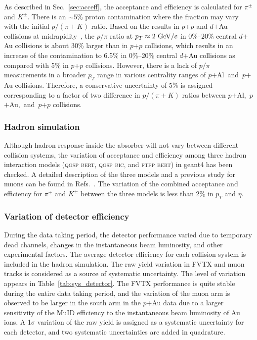 \documentclass[twocolumn,letterpaper,aps,prc,longbibliography,superscriptaddress,nofootinbib,floatfix]{revtex4-2}
\newcommand{\pt}{\mbox{$p_T$}\xspace}
\newcommand{\pp}{\mbox{$p$+$p$}\xspace}
\newcommand{\dau}{\mbox{$d$$+$Au}\xspace}
\newcommand{\pau}{\mbox{$p$$+$Au}\xspace}
\newcommand{\palau}{\mbox{$p$$+$Al and $p$$+$Au}\xspace}
\newcommand{\palaup}{\mbox{$p$$+$Al, $p$$+$Au, and $p$+$p$}\xspace}
\newcommand{\geant}{\mbox{{\sc geant4}}\xspace}
\begin{document}
As described in Sec.~\ref{sec:acceff}, the acceptance and efficiency is 
calculated for $\pi^{\pm}$ and $K^{\pm}$. There is an $\sim5\%$ proton 
contamination where the fraction may vary with the initial $p/(\pi+K)$ 
ratio. Based on the results in \pp and \dau collisions at 
midrapidity~\cite{Adare:2011vy,Agakishiev:2011dc,Adare:2013esx}, the 
$p/\pi$ ratio at $\pt\approx2~{\rm GeV}/c$ in 0\%--20\% central \dau 
collisions is about 30\% larger than in \pp collisions, which results in 
an increase of the contamination to 6.5\% in 0\%--20\% central \dau 
collisions as compared with 5\% in \pp collisions. However, there is a 
lack of $p/\pi$ measurements in a broader \pt range in various 
centrality ranges of \palau collisions. Therefore, a conservative 
uncertainty of 5\% is assigned corresponding to a factor of two 
difference in $p/(\pi+K)$ ratios between \palaup collisions.

\subsubsection{Hadron simulation}

Although hadron response inside the absorber will not vary between 
different collision systems, the variation of acceptance and efficiency 
among three hadron interaction models (\textsc{qgsp bert}, \textsc{qgsp 
bic}, and \textsc{ftfp bert}) in \geant has been checked. A detailed 
description of the three models and a previous study for muons can be 
found in Refs.~\cite{Agostinelli:2002hh,Aidala:2018ajl}. The variation 
of the combined acceptance and efficiency for $\pi^{\pm}$ and $K^{\pm}$ 
between the three models is less than 2\% in \pt and $\eta$.

\subsubsection{Variation of detector efficiency}

During the data taking period, the detector performance varied due to 
temporary dead channels, changes in the instantaneous beam luminosity, 
and other experimental factors. The average detector efficiency for each 
collision system is included in the hadron simulation.  The raw yield 
variation in FVTX and muon tracks is considered as a source of 
systematic uncertainty. The level of variation appears in 
Table~\ref{tab:sys_detector}. The FVTX performance is quite stable 
during the entire data taking period, and the variation of the muon arm 
is observed to be larger in the south arm in the \pau data due to a 
larger sensitivity of the MuID efficiency to the instantaneous beam 
luminosity of Au ions.  A 1$\sigma$ variation of the raw yield is 
assigned as a systematic uncertainty for each detector, and two 
systematic uncertainties are added in quadrature.
\end{document}
